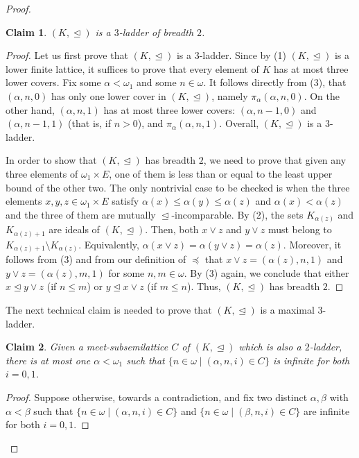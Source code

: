 \documentclass[]{amsart}
\newtheorem{claim}{Claim}[theorem]
\theoremstyle{definition}
\theoremstyle{remark}
\begin{document}
\begin{proof}
\begin{claim}
$(K, \trianglelefteq)$ is a $3$-ladder of breadth $2$.
\end{claim}
\begin{proof}
Let us first prove that $(K, \trianglelefteq)$ is a $3$-ladder. Since by (1) $(K, \trianglelefteq)$ is a lower finite lattice, it suffices to prove that every element of $K$ has at most three lower covers. Fix some $\alpha < \omega_1$ and some $n \in\omega$. It follows directly from (3), that $(\alpha, n, 0)$ has only one lower cover in $(K, \trianglelefteq)$, namely  $\pi_\alpha(\alpha, n, 0)$. On the other hand, $(\alpha, n, 1)$ has at most three lower covers: $(\alpha, n-1, 0)$ and $(\alpha, n-1, 1)$ (that is, if $n > 0$), and $\pi_\alpha(\alpha, n, 1)$. %
Overall, $(K, \trianglelefteq)$ is a $3$-ladder.

In order to show that $(K, \trianglelefteq)$ has breadth $2$, we need to prove that given any three elements of $\omega_1 \times E$, one of them is less than or equal to the least upper bound of the other two. The only nontrivial case to be checked is when the three elements $x,y,z \in \omega_1\times E$ satisfy $\alpha(x) \le \alpha(y) \le \alpha(z)$ and $\alpha(x) < \alpha(z)$ and the three of them are mutually $\trianglelefteq$-incomparable. By (2), the sets $K_{\alpha(z)}$ and $K_{\alpha(z)+1}$ are  ideals of $(K, \trianglelefteq)$. Then, both $x \vee z$ and $y \vee z$ must belong to $K_{\alpha(z)+1} \setminus K_{\alpha(z)}$. Equivalently, $\alpha(x \vee z) = \alpha(y \vee z) = \alpha(z)$. Moreover, it follows from (3) and from our definition of $\preceq$ that $x \vee z = (\alpha(z), n, 1)$ and $y \vee z = (\alpha(z), m, 1)$ for some $n,m\in\omega$. By (3) again, we conclude that either $x \trianglelefteq y \vee z$ (if $n \le m$) or $y \trianglelefteq x \vee z$ (if $m \le n$). Thus, $(K, \trianglelefteq)$ has breadth $2$.
\end{proof}

The next technical claim is needed to prove that $(K, \trianglelefteq)$ is a maximal $3$-ladder.
\begin{claim}\label{thm:main3:claim2}
Given a meet-subsemilattice $C$ of $(K, \trianglelefteq)$ which is also a $2$-ladder, there is at most one $\alpha < \omega_1$ such that $\{n \in \omega \mid (\alpha, n, i) \in C\}$ is infinite for both $i = 0,1$.
\end{claim}
\begin{proof}
Suppose otherwise, towards a contradiction, and fix two distinct $\alpha, \beta$ with $\alpha < \beta$ such that $\{n \in \omega \mid (\alpha, n, i) \in C\}$ and $\{n \in \omega \mid (\beta, n, i) \in C\}$ are infinite for both $i = 0,1$.


\end{proof}
\end{proof}
\end{document}
